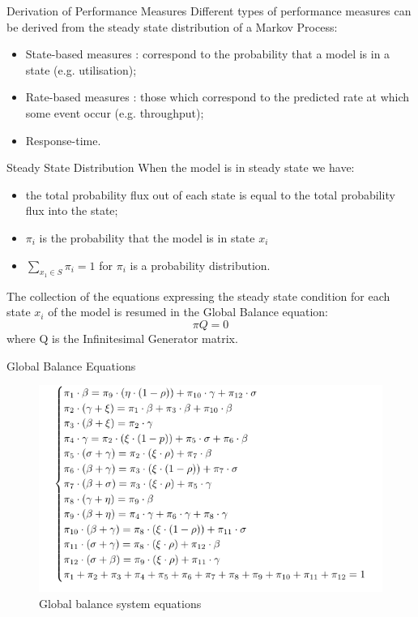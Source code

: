 \documentclass[8pt]{beamer}
\begin{document}
    \begin{frame}{Derivation of Performance Measures}
        Different types of performance measures can be derived from the steady state distribution of a Markov Process:
        \vspace{1cm}
        \begin{itemize}
            \item State-based measures : correspond to the probability that a model is in a state (e.g. utilisation);
            \item Rate-based measures : those which correspond to the predicted rate at which some event occur (e.g. throughput);
            \item Response-time.
        \end{itemize}
    \end{frame}

    \begin{frame}{Steady State Distribution}
        When the model is in steady state we have:
        \vspace{1cm}
        \begin{itemize}
            \item the total probability flux out of each state is equal to the total probability flux into the state;
            \item \(\pi_{i}\) is the probability that the model is in state \(x_{i}\) \item \(\sum\limits_{x_{1} \in S} \pi_{i} = 1\) for \({\pi_{i}}\) is a probability distribution.
        \end{itemize}
        \vspace{1cm}
        The collection of the equations expressing the steady state condition for each state \(x_{i}\) of the model is resumed in the Global Balance equation: \[\pi Q = 0\] where Q is the Infinitesimal Generator matrix.
    \end{frame}

    \begin{frame}{Global Balance Equations}
        \begin{figure}[h]
            \centering
            \includegraphics[width=1.0\textwidth]{Images/global-balance-system.png}
            \caption{Global balance system equations}
            \label{fig:global-balance-system}
        \end{figure}
    \end{frame}
\end{document}
